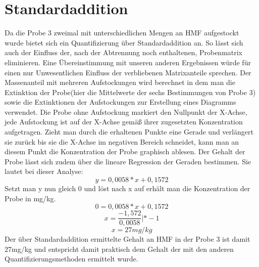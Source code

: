 \section{Standardaddition}
Da die Probe 3 zweimal mit unterschiedlichen Mengen an HMF aufgestockt wurde bietet sich ein Quantifizierung über Standardaddition an. So lässt sich auch der Einfluss der, nach der Abtrennung noch enthaltenen, Probenmatrix eliminieren. Eine Übereinstimmung mit unseren anderen Ergebnissen würde für einen nur Unwesentlichen Einfluss der verbliebenen Matrixanteile sprechen. Der Massenanteil mit mehreren Aufstockungen wird berechnet in dem man die Extinktion der Probe(hier die Mittelwerte der sechs Bestimmungen von Probe 3) sowie die Extinktionen der Aufstockungen zur Erstellung eines Diagramms verwendet. Die Probe ohne Aufstockung markiert den Nullpunkt der X-Achse, jede Aufstockung ist auf der X-Achse gemäß ihrer zugesetzten Konzentration aufgetragen. 
Zieht man durch die erhaltenen Punkte eine Gerade und verlängert sie zurück bis sie die X-Achse im negativen Bereich schneidet, kann man an diesem Punkt die Konzentration der Probe graphisch ablesen. Der Gehalt der Probe lässt sich zudem über die lineare Regression der Geraden bestimmen. Sie lautet bei dieser Analyse:
	\[y=0,0058*x+0,1572\] 
Setzt man y nun gleich 0 und löst nach x auf erhält man die Konzentration der Probe in mg/kg.
 	\[0=0,0058*x+0,1572\] 
	\[x=\frac{ -1,572 }{ 0,0058 }   |*-1\] 
	\[x=27mg/kg\] 
Der über Standardaddition ermittelte Gehalt an HMF in der Probe 3 ist damit 27mg/kg und entspricht damit praktisch dem Gehalt der mit den anderen Quantifizierungsmethoden ermittelt wurde.